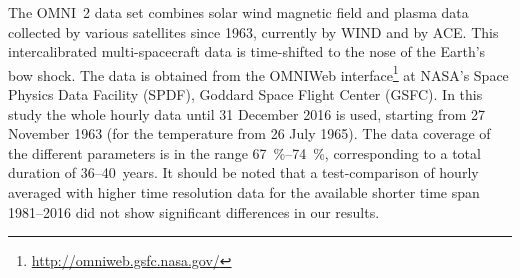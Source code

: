 The OMNI~2 data set \citep{King2005} combines solar wind magnetic field and plasma data collected by various satellites since 1963, currently by WIND and by ACE. This intercalibrated multi-spacecraft data is time-shifted to the nose of the Earth’s bow shock. The data is obtained from the OMNIWeb interface\footnote{\url{http://omniweb.gsfc.nasa.gov/}} at NASA's Space Physics Data Facility (SPDF), Goddard Space Flight Center (GSFC).
%
In this study the whole hourly data until 31 December 2016 is used, starting from 27 November 1963 (for the temperature from 26 July 1965). The data coverage of the different parameters is in the range \SIrange{67}{74}{\percent},  corresponding to a total duration of 36--40~years.
%
It should be noted that a test-comparison of hourly averaged with higher time resolution data for the available shorter time span 1981--2016 did not show significant differences in our results.

